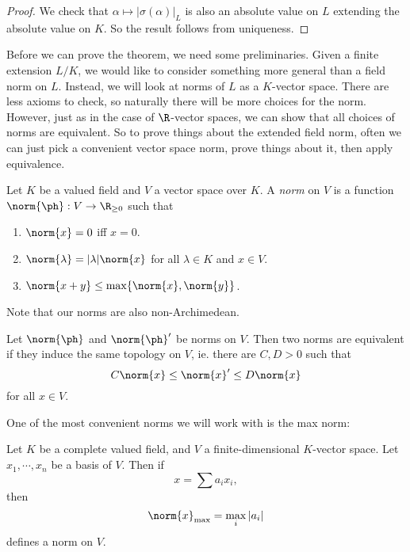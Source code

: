 \documentclass[a4paper]{article}
\begin{document}
\begin{proof}
  We check that $\alpha \mapsto |\sigma(\alpha)|_L$ is also an absolute value on $L$ extending the absolute value on $K$. So the result follows from uniqueness.
\end{proof}

Before we can prove the theorem, we need some preliminaries. Given a finite extension $L/K$, we would like to consider something more general than a field norm on $L$. Instead, we will look at norms of $L$ as a $K$-vector space. There are less axioms to check, so naturally there will be more choices for the norm. However, just as in the case of $\R$-vector spaces, we can show that all choices of norms are equivalent. So to prove things about the extended field norm, often we can just pick a convenient vector space norm, prove things about it, then apply equivalence.

\begin{defi}
  Let $K$ be a valued field and $V$ a vector space over $K$. A \emph{norm} on $V$ is a function $\norm{\ph}: V \to \R_{\geq 0}$ such that
  \begin{enumerate}
    \item $\norm{x} = 0$ iff $x = 0$.
    \item $\norm{\lambda} = |\lambda|\norm{x}$ for all $\lambda \in K$ and $x \in V$.
    \item $\norm{x + y} \leq \max \{\norm{x}, \norm{y}\}$.
  \end{enumerate}
\end{defi}
Note that our norms are also non-Archimedean.

\begin{defi}
  Let $\norm{\ph}$ and $\norm{\ph}'$ be norms on $V$. Then two norms are equivalent if they induce the same topology on $V$, ie. there are $C, D > 0$ such that
  \[
    C\norm{x} \leq \norm{x}'\leq D\norm{x}
  \]
  for all $x \in V$.
\end{defi}

One of the most convenient norms we will work with is the max norm:
\begin{eg}
  Let $K$ be a complete valued field, and $V$ a finite-dimensional $K$-vector space. Let $x_1, \cdots, x_n$ be a basis of $V$. Then if
  \[
    x = \sum a_i x_i,
  \]
  then
  \[
    \norm{x}_{\mathrm{max}} = \max_i |a_i|
  \]
  defines a norm on $V$.
\end{eg}
\end{document}
